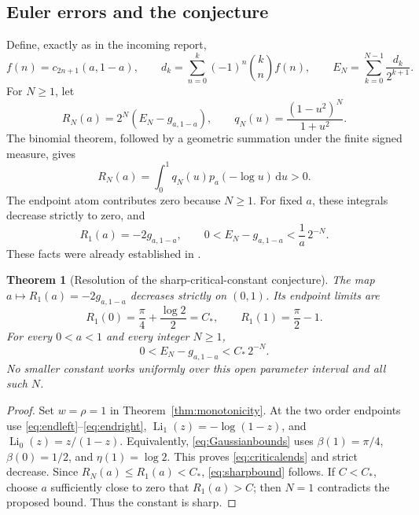 \documentclass[11pt]{article}
\numberwithin{equation}{section}
\newtheorem{theorem}{Theorem}[section]
\theoremstyle{definition}\newtheorem{definition}[theorem]{Definition}
\theoremstyle{remark}\newtheorem{remark}[theorem]{Remark}
\newcommand{\dd}{\,\mathrm d}
\newcommand{\Cstar}{C_*}
\DeclareMathOperator{\Li}{Li}
\begin{document}
\subsection{Euler errors and the conjecture}
Define, exactly as in the incoming report,
\begin{equation}\label{eq:eulerdef}
 f(n)=c_{2n+1}(a,1-a),\qquad
 d_k=\sum_{n=0}^k(-1)^n\binom kn f(n),\qquad
 E_N=\sum_{k=0}^{N-1}\frac{d_k}{2^{k+1}}.
\end{equation}
For $N\ge1$, let
\begin{equation}\label{eq:Rdef}
 R_N(a)=2^N(E_N-g_{a,1-a}),\qquad
 q_N(u)=\frac{(1-u^2)^N}{1+u^2}.
\end{equation}
The binomial theorem, followed by a geometric summation under the finite
signed measure, gives
\begin{equation}\label{eq:Rintegral}
 R_N(a)=\int_0^1q_N(u)p_a(-\log u)\dd u>0.
\end{equation}
The endpoint atom contributes zero because $N\ge1$. For fixed $a$,
these integrals decrease strictly to zero, and
\begin{equation}\label{eq:R1}
 R_1(a)=-2g_{a,1-a},\qquad
 0<E_N-g_{a,1-a}<\frac1a\,2^{-N}.
\end{equation}
These facts were already established in \cite[Section~9]{threshold}.

\begin{theorem}[Resolution of the sharp-critical-constant conjecture]
\label{thm:sharp}
The map $a\mapsto R_1(a)=-2g_{a,1-a}$ decreases strictly on $(0,1)$.
Its endpoint limits are
\begin{equation}\label{eq:criticalends}
 R_1(0)=\frac\pi4+\frac{\log2}{2}=\Cstar,
 \qquad R_1(1)=\frac\pi2-1.
\end{equation}
For every $0<a<1$ and every integer $N\ge1$,
\begin{equation}\label{eq:sharpbound}
 0<E_N-g_{a,1-a}<\Cstar\,2^{-N}.
\end{equation}
No smaller constant works uniformly over this open parameter interval
and all such $N$.
\end{theorem}
\begin{proof}
Set $w=\rho=1$ in Theorem~\ref{thm:monotonicity}.
At the two order endpoints use \eqref{eq:endleft}--\eqref{eq:endright},
$\Li_1(z)=-\log(1-z)$, and $\Li_0(z)=z/(1-z)$.
Equivalently, \eqref{eq:Gaussianbounds} uses
$\beta(1)=\pi/4$, $\beta(0)=1/2$, and $\eta(1)=\log2$.
This proves \eqref{eq:criticalends} and strict decrease.
Since $R_N(a)\le R_1(a)<\Cstar$, \eqref{eq:sharpbound} follows.
If $C<\Cstar$, choose $a$ sufficiently close to zero that $R_1(a)>C$;
then $N=1$ contradicts the proposed bound. Thus the constant is sharp.
\end{proof}
\end{document}
